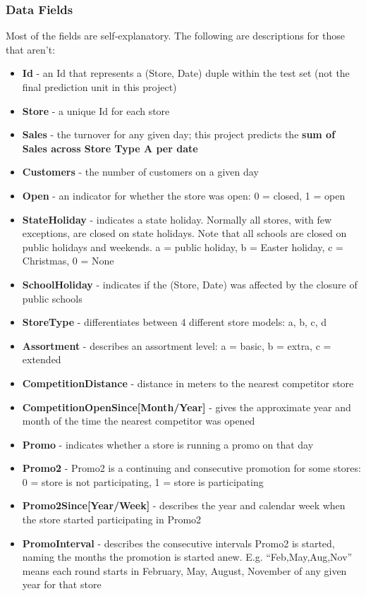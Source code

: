 \documentclass[
  12pt,
]{article}
\providecommand{\tightlist}{%
  \setlength{\itemsep}{0pt}\setlength{\parskip}{0pt}}
\begin{document}
\subsubsection{Data Fields}\label{data-fields}

Most of the fields are self-explanatory. The following are descriptions
for those that aren't:

\begin{itemize}
\tightlist
\item
  \textbf{Id} - an Id that represents a (Store, Date) duple within the
  test set (not the final prediction unit in this project)
\item
  \textbf{Store} - a unique Id for each store
\item
  \textbf{Sales} - the turnover for any given day; this project predicts
  the \textbf{sum of Sales across Store Type A per date}
\item
  \textbf{Customers} - the number of customers on a given day
\item
  \textbf{Open} - an indicator for whether the store was open: 0 =
  closed, 1 = open
\item
  \textbf{StateHoliday} - indicates a state holiday. Normally all
  stores, with few exceptions, are closed on state holidays. Note that
  all schools are closed on public holidays and weekends. a = public
  holiday, b = Easter holiday, c = Christmas, 0 = None
\item
  \textbf{SchoolHoliday} - indicates if the (Store, Date) was affected
  by the closure of public schools
\item
  \textbf{StoreType} - differentiates between 4 different store models:
  a, b, c, d
\item
  \textbf{Assortment} - describes an assortment level: a = basic, b =
  extra, c = extended
\item
  \textbf{CompetitionDistance} - distance in meters to the nearest
  competitor store
\item
  \textbf{CompetitionOpenSince{[}Month/Year{]}} - gives the approximate
  year and month of the time the nearest competitor was opened
\item
  \textbf{Promo} - indicates whether a store is running a promo on that
  day
\item
  \textbf{Promo2} - Promo2 is a continuing and consecutive promotion for
  some stores: 0 = store is not participating, 1 = store is
  participating
\item
  \textbf{Promo2Since{[}Year/Week{]}} - describes the year and calendar
  week when the store started participating in Promo2
\item
  \textbf{PromoInterval} - describes the consecutive intervals Promo2 is
  started, naming the months the promotion is started anew. E.g.
  ``Feb,May,Aug,Nov'' means each round starts in February, May, August,
  November of any given year for that store
\end{itemize}
\end{document}
